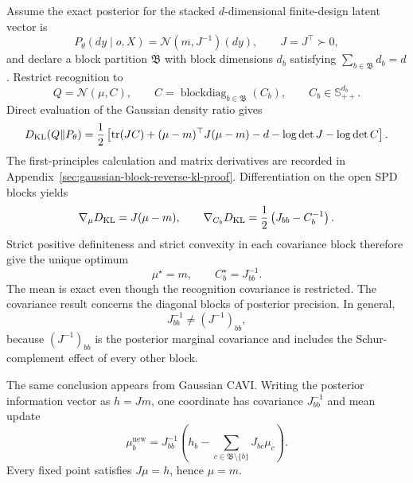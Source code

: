 Assume the exact posterior for the stacked \(d\)-dimensional finite-design latent vector is
\begin{equation}
P_\theta(dy\mid o,X)=\mathcal N(m,J^{-1})(dy),
\qquad
J=J^\top\succ0,
\label{eq:gaussian-exact-posterior}
\end{equation}
and declare a block partition \(\mathfrak B\) with block dimensions \(d_b\) satisfying \(\sum_{b\in\mathfrak B}d_b=d\). Restrict recognition to
\begin{equation}
Q=\mathcal N(\mu,C),
\qquad
C=\operatorname{blockdiag}_{b\in\mathfrak B}(C_b),
\qquad
C_b\in\mathbb S_{++}^{d_b}.
\label{eq:gaussian-block-product-family}
\end{equation}
Direct evaluation of the Gaussian density ratio gives
\begin{equation}
D_{\mathrm{KL}}(Q\Vert P_\theta)
=\frac12\left[
\operatorname{tr}(JC)
+(\mu-m)^\top J(\mu-m)
-d-\log\det J-\log\det C
\right].
\label{eq:gaussian-reverse-kl-block}
\end{equation}
The first-principles calculation and matrix derivatives are recorded in Appendix~\ref{sec:gaussian-block-reverse-kl-proof}. Differentiation on the open SPD blocks yields
\begin{equation}
\nabla_\mu D_{\mathrm{KL}}=J(\mu-m),
\qquad
\nabla_{C_b}D_{\mathrm{KL}}=\frac12\left(J_{bb}-C_b^{-1}\right).
\label{eq:gaussian-reverse-kl-derivatives}
\end{equation}
Strict positive definiteness and strict convexity in each covariance block therefore give the unique optimum
\begin{equation}
\mu^\star=m,
\qquad
C_b^\star=J_{bb}^{-1}.
\label{eq:gaussian-block-reverse-kl-optimum}
\end{equation}
The mean is exact even though the recognition covariance is restricted. The covariance result concerns the diagonal blocks of posterior precision. In general,
\begin{equation}
J_{bb}^{-1}\neq(J^{-1})_{bb},
\label{eq:precision-block-not-marginal-covariance}
\end{equation}
because \((J^{-1})_{bb}\) is the posterior marginal covariance and includes the Schur-complement effect of every other block.

The same conclusion appears from Gaussian CAVI. Writing the posterior information vector as \(h=Jm\), one coordinate has covariance \(J_{bb}^{-1}\) and mean update
\begin{equation}
\mu_b^{\mathrm{new}}
=J_{bb}^{-1}
\left(h_b-\sum_{c\in\mathfrak B\setminus\{b\}}J_{bc}\mu_c\right).
\label{eq:gaussian-cavi-mean-update}
\end{equation}
Every fixed point satisfies \(J\mu=h\), hence \(\mu=m\).

